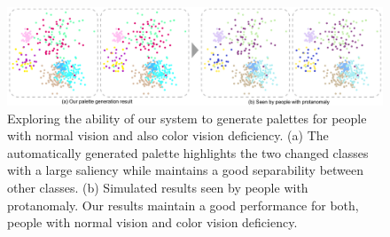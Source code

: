 \documentclass[review,onecolumn]{vgtc}                %
\begin{document}
\begin{figure}[ht]
\centering
\includegraphics[width=0.96\linewidth]{blindness.pdf}
\caption{Exploring the ability of our system to generate palettes for people with normal vision and also color vision deficiency. (a) The automatically generated palette highlights the two changed classes with a large saliency while maintains a good separability between other classes. (b) Simulated results seen by people with protanomaly. Our results maintain a good performance for both, people with normal vision and color vision deficiency.}
\vspace*{-3mm}
\label{fig:blindness}
\end{figure}



\end{document}
